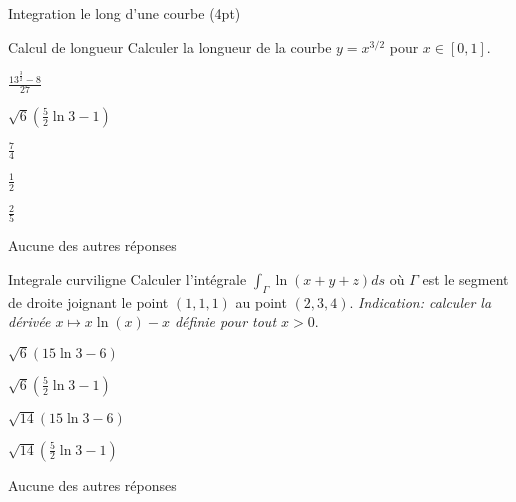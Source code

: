 \documentclass[12pt]{article}
\begin{document}
\begin{quiz}[points=4, shuffle, penalty=.5]
  {Integration le long d'une courbe (4pt)}

  \begin{multi}{Calcul de longueur}
    Calculer la longueur de la courbe $y= x^{3/2}$ pour $x\in[0,1]$.
  \item* $ \frac{{{13}^{\frac{3}{2}} -8}}{27}$
  \item $\sqrt{6}\left( \frac 5 2 \ln 3 -1 \right)$
  \item $\frac 7 4$
  \item $\frac 1 2$
  \item $\frac 2 5$
  \item Aucune des autres r\'{e}ponses
  \end{multi}
  \begin{multi}{Integrale curviligne}   
    Calculer l'int\'{e}grale $\int_\Gamma \ln(x + y + z)ds$ o\`{u} $\Gamma$ est le segment de droite joignant le point $(1, 1, 1)$ au point $(2, 3, 4)$. \textit{Indication: calculer la d\'{e}riv\'{e}e $x\mapsto x\ln(x) -x$ d\'{e}finie pour tout $x>0$}.
  \item  $\sqrt{6}\left( 15 \ln 3 - 6 \right)$
  \item  $\sqrt{6}\left( \frac 5 2 \ln 3 -1 \right)$
  \item  $\sqrt{14}\left( 15 \ln 3 - 6 \right)$
  \item* $\sqrt{14}\left( \frac 5 2 \ln 3 -1 \right)$
  \item Aucune des autres r\'{e}ponses
  \end{multi}
\end{quiz}
\end{document}
